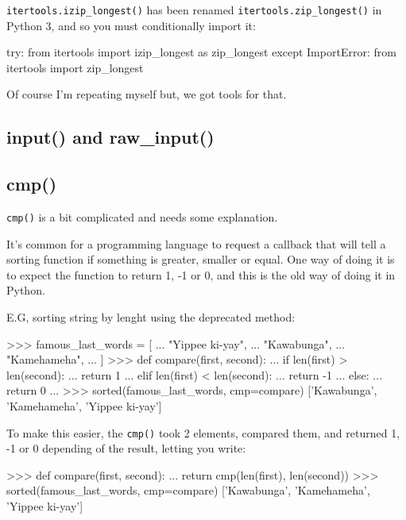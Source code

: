 \lstinline{itertools.izip_longest()} has been renamed \lstinline{itertools.zip_longest()} in Python 3, and so you must conditionally import it:

\begin{py2and3}
try:
    from itertools import izip_longest as zip_longest
except ImportError:
    from itertools import zip_longest
\end{py2and3}

Of course I'm repeating myself but, we got tools for that.

\subsection{input() and raw\_input()}




















\subsection{cmp()}

\lstinline{cmp()} is a bit complicated and needs some explanation.

It's common for a programming language to request a callback that will tell a sorting function if something is greater, smaller or equal. One way of doing it is to expect the function to return 1, -1 or 0, and this is the old way of doing it in Python.

E.G, sorting string by lenght using the deprecated method:

\begin{py2}
>>> famous_last_words = [
...     "Yippee ki-yay",
...     "Kawabunga",
...     "Kamehameha",
... ]
>>> def compare(first, second):
...     if len(first) > len(second):
...         return 1
...     elif len(first) < len(second):
...         return -1
...     else:
...         return 0
...
>>> sorted(famous_last_words, cmp=compare)
['Kawabunga', 'Kamehameha', 'Yippee ki-yay']
\end{py2}

To make this easier, the \lstinline{cmp()} took 2 elements, compared them, and returned 1, -1 or 0 depending of the result, letting you write:


\begin{py2}
>>> def compare(first, second):
...     return cmp(len(first), len(second))
>>> sorted(famous_last_words, cmp=compare)
['Kawabunga', 'Kamehameha', 'Yippee ki-yay']
\end{py2}

